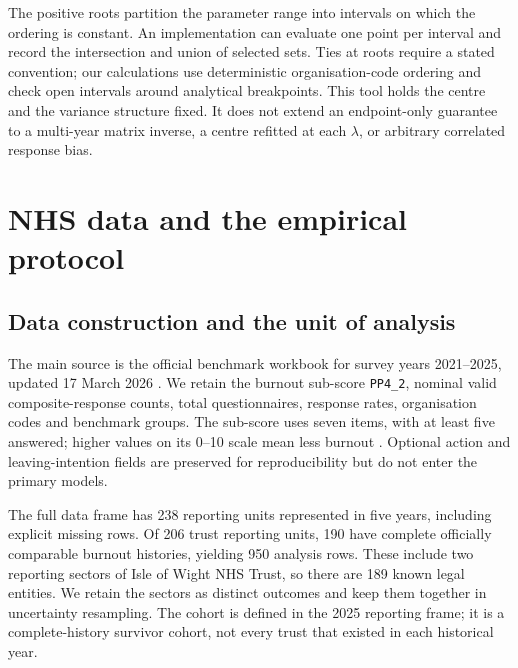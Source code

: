 \documentclass[11pt,letterpaper]{article}
\begin{document}
The positive roots partition the parameter range into intervals on which the ordering is constant. An implementation can evaluate one point per interval and record the intersection and union of selected sets. Ties at roots require a stated convention; our calculations use deterministic organisation-code ordering and check open intervals around analytical breakpoints. This tool holds the centre and the variance structure fixed. It does not extend an endpoint-only guarantee to a multi-year matrix inverse, a centre refitted at each $\lambda$, or arbitrary correlated response bias.

\section{NHS data and the empirical protocol}
\subsection{Data construction and the unit of analysis}
The main source is the official benchmark workbook for survey years 2021--2025, updated 17 March 2026 \citep{nhs2025workbook}. We retain the burnout sub-score \texttt{PP4\_2}, nominal valid composite-response counts, total questionnaires, response rates, organisation codes and benchmark groups. The sub-score uses seven items, with at least five answered; higher values on its 0--10 scale mean less burnout \citep{nhs2025technical}. Optional action and leaving-intention fields are preserved for reproducibility but do not enter the primary models.

The full data frame has 238 reporting units represented in five years, including explicit missing rows. Of 206 trust reporting units, 190 have complete officially comparable burnout histories, yielding 950 analysis rows. These include two reporting sectors of Isle of Wight NHS Trust, so there are 189 known legal entities. We retain the sectors as distinct outcomes and keep them together in uncertainty resampling. The cohort is defined in the 2025 reporting frame; it is a complete-history survivor cohort, not every trust that existed in each historical year.

\begin{table}[t]
\centering\small

\caption{Complete-history cohort and nominal valid burnout responses in 2025. Counts describe reporting units, not independent legal entities or effective sample sizes.}
\label{tab:cohort}
\end{table}
\end{document}
